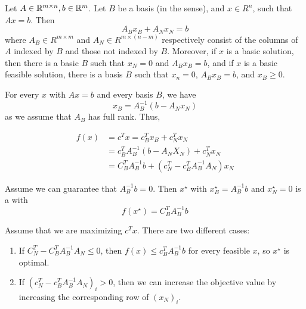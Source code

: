 Let $A \in \mathbb{R}^{m \times n}, b \in \mathbb{R}^{m}$.  Let $B$ be a basis (in the
\bfs sense), and $x \in R^{n}$, such that $Ax = b$.  Then
\begin{equation}
  \label{eq:20}
  A_{B} x_{B} + A_{N} x_{N} = b
\end{equation} where $A_{B} \in R^{m \times m}$ and $A_{N} \in R^{m
  \times ( n - m)}$ respectively consist of the columns of $A$ indexed
by $B$ and those not indexed by $B$. Moreover, if $x$ is a basic
solution, then there is a basic $B$ such that $x_{N} = 0$ and $A_{B}
x_{B} = b$, and if $x$ is a basic feasible solution, there is a basis
$B$ such that $x_{n} = 0$, $A_{B} x_{B} = b$, and $x_{B} \geq 0$.

For every $x$ with $Ax = b$ and every basis $B$, we have
\begin{equation}
  \label{eq:21}
  x_{B} = A_{B}^{-1} (b - A_{N} x_{N})
\end{equation} as we assume that $A_{B}$ has full rank.  Thus,

\begin{align}
  \label{eq:23}
  f(x) & = c^{T} x = c_{B}^{T} x_{B} + c^{T}_{N} x_{N}             \\
       & = c_{B}^{T} A_{B}^{-1}(b - A_{N} X_{N}) + c^{T}_{N} x_{N} \\
       & = C_{B}^{T} A_{B}^{-1} b + (c_{N}^{T} - c_{B}^{T} A_{B}^{-1} A_{N}) x_{N}
\end{align}

Assume we can guarantee that $A_{B}^{-1} b = 0$.  Then $x^{\star}$ with
$x_{B}^{\star} = A_{B}^{-1} b$ and $x_{N}^{\star} = 0$ is a \bfs with
\begin{equation}
  \label{eq:24}
  f(x^{\star}) = C_{B}^{T} A_{B}^{-1} b
\end{equation}

Assume that we are maximizing $c^{T} x$.  There are two different
cases:
\begin{enumerate}
\item If $C_{N}^{T} - C_{B}^{T} A_{B}^{-1} A_{N} \leq 0$, then $f(x)
  \leq c_{B}^{T} A_{B}^{-1} b$ for every feasible $x$, so $x^{\star}$
  is optimal.
\item If $(c_{N}^{T} - c_{B}^{T} A_{B}^{-1} A_{N})_{i} > 0$, then we
  can increase the objective value by increasing the corresponding row
  of $(x_{N})_{i}$.
\end{enumerate}

